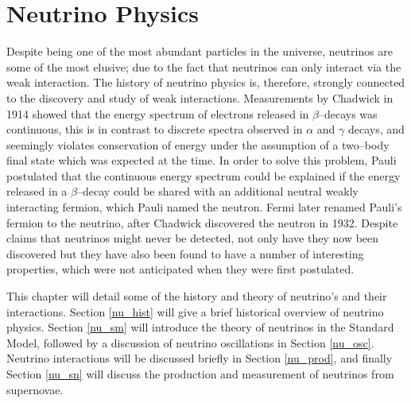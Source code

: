 \chapter{\label{ch:neutrinophysics}Neutrino Physics} 



 

\minitoc

Despite being one of the most abundant particles in the universe, neutrinos are 
some of the most elusive; due to the fact that neutrinos can only interact via
the weak interaction. The history of neutrino physics is, therefore, strongly
connected to the discovery and study of weak interactions. Measurements by
Chadwick in 1914 showed that the energy spectrum of electrons released in
$\beta$--decays was continuous, this is in contrast to discrete spectra
observed in $\alpha$ and $\gamma$ decays, and seemingly violates
conservation of energy under the assumption of a two--body final state which was
expected at the time. In order to solve this problem, Pauli postulated that the 
continuous energy spectrum could be explained if the energy released in a 
$\beta$--decay could be shared with an additional neutral weakly interacting 
fermion, which Pauli named the neutron. Fermi later renamed Pauli's fermion to 
the neutrino, after Chadwick discovered the neutron in 1932. Despite claims 
that neutrinos might never be detected, not only have they now been discovered
but they have also been found to have a number of interesting properties, which 
were not anticipated when they were first postulated. 

This chapter will detail some of the history and theory of neutrino's and their 
interactions. Section \ref{nu_hist} will give a brief historical overview of 
neutrino physics. Section \ref{nu_sm} will introduce the theory of neutrinos 
in the Standard Model, followed by a discussion of neutrino oscillations in 
Section \ref{nu_osc}. Neutrino interactions will be discussed briefly in 
Section \ref{nu_prod}, and finally Section \ref{nu_sn} will discuss the 
production and measurement of neutrinos from supernovae.

